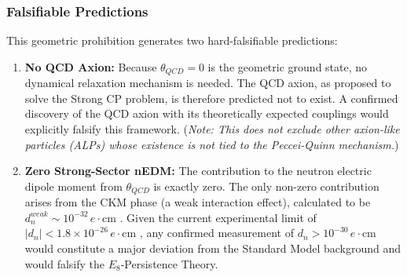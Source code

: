 \subsubsection{Falsifiable Predictions}
This geometric prohibition generates two hard-falsifiable predictions:
\begin{enumerate}
    \item \textbf{No QCD Axion:} Because $\theta_{QCD}=0$ is the geometric ground state, no dynamical relaxation mechanism is needed. The QCD axion, as proposed to solve the Strong CP problem, is therefore predicted not to exist. A confirmed discovery of the QCD axion with its theoretically expected couplings would explicitly falsify this framework. (\textit{Note: This does not exclude other axion-like particles (ALPs) whose existence is not tied to the Peccei-Quinn mechanism.})
    
    \item \textbf{Zero Strong-Sector nEDM:} The contribution to the neutron electric dipole moment from $\theta_{QCD}$ is exactly zero. The only non-zero contribution arises from the CKM phase (a weak interaction effect), calculated to be $d_n^{weak} \sim 10^{-32} \, e\cdot\text{cm}$ \cite{pospelov_electric_2005}. Given the current experimental limit of $|d_n| < 1.8 \times 10^{-26} \, e\cdot\text{cm}$ \cite{abel_measurement_2020}, any confirmed measurement of $d_n > 10^{-30} \, e\cdot\text{cm}$ would constitute a major deviation from the Standard Model background and would falsify the $E_8$-Persistence Theory.
\end{enumerate}